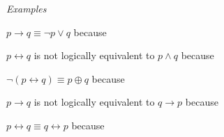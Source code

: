 
    {\it Examples} 
    
    $p \to q \equiv \lnot p \lor q$ because \underline{\phantom{\hspace{4in}}} 
    
    \vfill
    
    $p \leftrightarrow q$ is not logically equivalent to $p \land q$ because \underline{\phantom{\hspace{4in}}} 
    
    \vfill
    
    $\lnot( p \leftrightarrow q) \equiv p \oplus q$ because \underline{\phantom{\hspace{4in}}} 
    
    \vfill
    
    
    $p \to q$ is not logically equivalent to $q \to p$ because \underline{\phantom{\hspace{4in}}} 
    
    \vfill
    
    $p \leftrightarrow q \equiv q \leftrightarrow p$ because \underline{\phantom{\hspace{4in}}} 
    
    \vfill